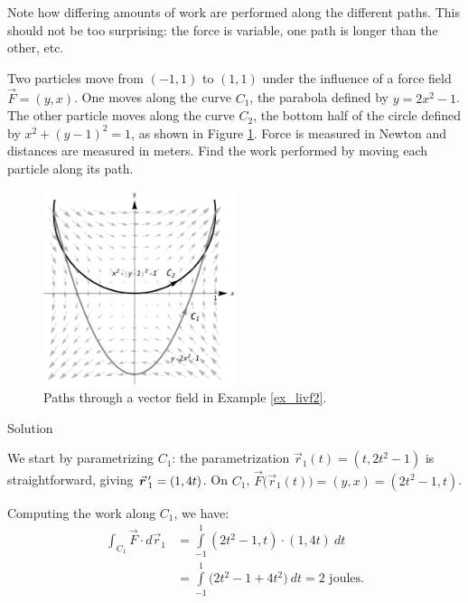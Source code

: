 \begin{example}
Note how differing amounts of work are performed along the different paths. This should not be too surprising: the force is variable, one path is longer than the other, etc.
\end{example}

\begin{example}\label{ex_livf2}
Two particles move from $(-1,1)$ to $(1,1)$ under the influence of a force field $\vec F = \left( y, x\right)$. One moves along the curve $C_1$, the parabola defined by $y = 2x^2-1$. The other particle moves along the curve $C_2$, the bottom half of the circle defined by $x^2+(y-1)^2=1$, as shown in Figure \ref{fig_double_29}. Force is measured in Newton and distances are measured in meters. Find the work performed by moving each particle along its path.

\begin{figure}[H]
	\begin{center}
			\includegraphics[width=0.5\textwidth]{fig_double_29}
	\caption{Paths through a vector field in Example \ref{ex_livf2}.}
	\label{fig_double_29}
	\end{center}
\end{figure}


Solution 

We start by parametrizing $C_1$: the parametrization $\vec r_1(t) = \left( t, 2t^2-1\right)$ is straightforward, giving $\vrp_1 = \left( 1,4t\right)$. On $C_1$, $\vec F\big(\vec r_1(t)\big) = \left( y,x\right) = \left( 2t^2-1,t\right)$.


Computing the work along $C_1$, we have:
\begin{align*}
\int_{C_1} \vec F\cdot d\vec r_1 & = \int\limits_{-1}^1 \left( 2t^2-1,t\right)\cdot\left( 1,4t\right)\ dt \\
		&= \int\limits_{-1}^1 \big(2t^2-1+4t^2\big)\ dt = 2 \text{ joules}.
\end{align*}






\end{example}
